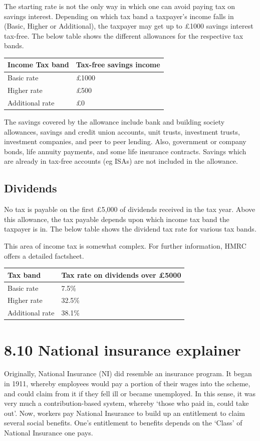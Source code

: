 \documentclass[]{tufte-handout}
\begin{document}
The starting rate is not the only way in which one can avoid paying tax
on savings interest. Depending on which tax band a taxpayer's income
falls in (Basic, Higher or Additional), the taxpayer may get up to £1000
savings interest tax-free. The below table shows the different
allowances for the respective tax bands.

\begin{longtable}[]{@{}ll@{}}
\toprule
Income Tax band & Tax-free savings income\tabularnewline
\midrule
\endhead
Basic rate & £1000\tabularnewline
Higher rate & £500\tabularnewline
Additional rate & £0\tabularnewline
\bottomrule
\end{longtable}

The savings covered by the allowance include bank and building society
allowances, savings and credit union accounts, unit trusts, investment
trusts, investment companies, and peer to peer lending. Also, government
or company bonds, life annuity payments, and some life insurance
contracts. Savings which are already in tax-free accounts (eg ISAs) are
not included in the allowance.

\hypertarget{dividends}{%
\subsection{Dividends}\label{dividends}}

No tax is payable on the first £5,000 of dividends received in the tax
year. Above this allowance, the tax payable depends upon which income
tax band the taxpayer is in. The below table shows the dividend tax rate
for various tax bands.

This area of income tax is somewhat complex. For further information,
HMRC offers a detailed factsheet.

\begin{longtable}[]{@{}ll@{}}
\toprule
Tax band & Tax rate on dividends over £5000\tabularnewline
\midrule
\endhead
Basic rate & 7.5\%\tabularnewline
Higher rate & 32.5\%\tabularnewline
Additional rate & 38.1\%\tabularnewline
\bottomrule
\end{longtable}

\hypertarget{national-insurance-explainer}{%
\section{8.10 National insurance
explainer}\label{national-insurance-explainer}}

Originally, National Insurance (NI) did resemble an insurance program.
It began in 1911, whereby employees would pay a portion of their wages
into the scheme, and could claim from it if they fell ill or became
unemployed. In this sense, it was very much a contribution-based system,
whereby `those who paid in, could take out'. Now, workers pay National
Insurance to build up an entitlement to claim several social benefits.
One's entitlement to benefits depends on the `Class' of National
Insurance one pays.
\end{document}
